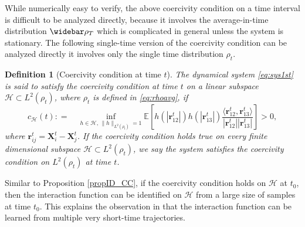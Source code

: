 \documentclass[]{elsarticle}
\def\E{\mathbb{E}}
\newcommand{\wbar}\widebar
\newcommand{\mbf}[1]{\boldsymbol{#1}}
\newcommand{\innerp}[2]{\langle #1,#2 \rangle}
\newcommand{\br}{\mbf{r}}
\newcommand{\bX}{\mbf{X}}
\newcommand{\hypspace}{\mathcal{H}}
\newtheorem{definition}[theorem]{Definition}
\numberwithin{equation}{section}
\numberwithin{theorem}{section}
\newcommand{\ST}[1]{\textcolor{red}{{#1}}}
\begin{document}
While numerically easy to verify, the above coercivity condition on a time interval is difficult to be analyzed directly, because it involves the average-in-time distribution $\wbar \rho_T$ which is complicated in general unless the system is stationary. The following single-time version of the coercivity condition can be analyzed directly it involves only the single time distribution $\rho_t$. 

\begin{definition}[Coercivity condition at time $t$] \label{def_coercivty_t}
The dynamical system \eqref{eq:sys1st}  is said to satisfy the coercivity condition at time $t$ on a linear subspace $\mathcal{H}\subset L^2( \rho_t)$, where $\rho_t$ is defined in \eqref{eq:rhoavg}, if
\begin{equation} \label{eq:c_t}
c_{\mathcal{H}}(t) : = \quad \inf_{h\in  \mathcal{H}, \, \|h\|_{L^2(\rho_t)}=1} \E[h(|\br_{12}^t|)h(|\br_{13}^t|)\frac{\innerp{\br_{12}^t}{\br_{13}^t}}{|\br_{12}^t||\br_{13}^t|} ] >0,
\end{equation}
where $\br_{ij}^t = \bX^{t}_i- \bX^t_j$. If the coercivity condition holds true on every finite dimensional subspace $\mathcal{H} \subset L^2(\rho_t)$, we say the system satisfies the coercivity condition on $L^2(\rho_t)$ at time $t$. 
\end{definition}

Similar to Proposition \ref{propID_CC}, if the coercivity condition holds on $\hypspace$ at $t_0$, then the interaction function can be identified on $\hypspace$ from a large size of samples at time $t_0$. This explains the observation in \cite{LZTM19, LMT19,LMT20} that the interaction function can be learned from multiple very short-time trajectories. 






\end{document}
